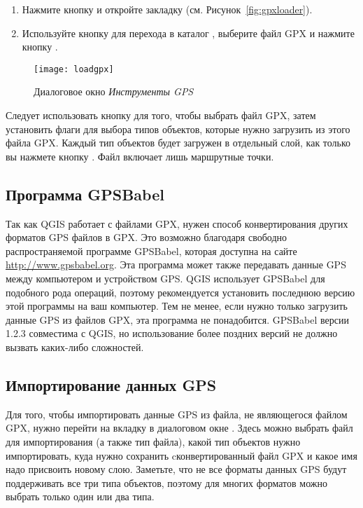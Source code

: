 \begin{enumerate}
\item Нажмите кнопку  и
откройте закладку  (см. Рисунок~\ref{fig:gpxloader}).
\item Используйте кнопку  для перехода в каталог
, выберите файл GPX
 и нажмите кнопку .
\end{enumerate}

\begin{figure}[ht]
   \centering
   \texttt{[image: loadgpx]}
   \caption{Диалоговое окно \emph{Инструменты GPS} \wincaption}\label{gpxloader}
\end{figure}

Следует использовать кнопку \browsebutton для того, чтобы выбрать файл
GPX, затем установить флаги для выбора типов объектов, которые нужно
загрузить из этого файла GPX. Каждый тип объектов будет загружен в
отдельный слой, как только вы нажмете кнопку . Файл
 включает лишь маршрутные точки.

\subsection{Программа GPSBabel}

Так как QGIS работает с файлами GPX, нужен способ конвертирования других
форматов GPS файлов в GPX. Это возможно благодаря свободно
распространяемой программе GPSBabel, которая доступна на сайте
\url{http://www.gpsbabel.org}. Эта программа может также передавать
данные GPS между компьютером и устройством GPS. QGIS использует GPSBabel
для подобного рода операций, поэтому рекомендуется установить последнюю
версию этой программы на ваш компьютер. Тем не менее, если нужно только
загрузить данные GPS из файлов GPX, эта программа не понадобится.
GPSBabel версии 1.2.3 совместима с QGIS, но использование более поздних
версий не должно вызвать каких-либо сложностей.

\subsection{Импортирование данных GPS}

Для того, чтобы импортировать данные GPS из файла, не являющегося файлом
GPX, нужно перейти на вкладку  в диалоговом окне
. Здесь можно выбрать файл для импортирования
(а также тип файла), какой тип объектов нужно импортировать, куда нужно
сохранить cконвертированный файл GPX и какое имя надо присвоить новому
слою. Заметьте, что не все форматы данных GPS будут поддерживать все
три типа объектов, поэтому для многих форматов можно выбрать только один
или два типа.


